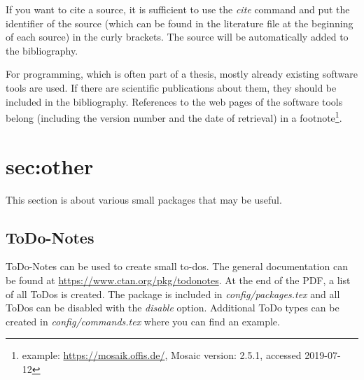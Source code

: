 If you want to cite a source, it is sufficient to use the \textit{cite} command and put the identifier of the source (which can be found in the literature file at the beginning of each source) in the curly brackets.
The source will be automatically added to the bibliography.



For programming, which is often part of a thesis, mostly already existing software tools are used. If there are scientific publications about them, they should be included in the bibliography. References to the web pages of the software tools belong (including the version number and the date of retrieval) in a footnote\footnote{example: \url{https://mosaik.offis.de/}, Mosaic version: 2.5.1, accessed 2019-07-12}.

\section{sec:other}
\label{sec:other}

This section is about various small packages that may be useful.
\subsection{ToDo-Notes}
ToDo-Notes can be used to create small to-dos. The general documentation can be found at \url{https://www.ctan.org/pkg/todonotes}.
At the end of the PDF, a list of all ToDos is created.
The package is included in \textit{config/packages.tex} and all ToDos can be disabled with the \textit{disable} option.
Additional ToDo types can be created in \textit{config/commands.tex} where you can find an example.


